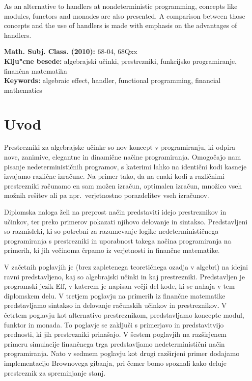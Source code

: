 \documentclass[a4paper,12pt]{article}
\theoremstyle{definition} %
\begin{document}
As an alternative to handlers at nondeterministic programming, concepts like modules, functors and monades are also presented. A comparison between those concepts and the use of handlers is made with emphasis on the advantages of handlers.

\vfill\noindent
{\bf Math. Subj. Class. (2010):} 68-04, 68Qxx  \\[1mm]  
{\bf Klju"cne besede:} algebrajski učinki, prestrezniki, funkcijsko programiranje, finančna matematika  \\[1mm]  
{\bf Keywords:}  algebraic effect, handler, functional programming, financial mathematics
\pagebreak

\pagebreak

\section{Uvod}

Prestrezniki za algebrajske učinke so nov koncept v programiranju, ki odpira nove, zanimive, elegantne in dinamične načine programiranja. Omogočajo nam pisanje nedeterminističnih programov, s katerimi lahko na identični  kodi kasneje izvajamo različne izračune. Na primer tako, da na enaki kodi z različnimi prestrezniki računamo en sam možen izračun, optimalen izračun, množico vseh možnih rešitev ali pa npr.\ verjetnostno porazdelitev vseh izračunov. 

Diplomska naloga želi na preprost način predstaviti idejo prestreznikov in učinkov, ter preko primerov pokazati njihovo delovanje in sintakso. Predstavljeni so razmisleki, ki so potrebni za razumevanje logike nedeterminističnega programiranja s prestrezniki in uporabnost takega načina programiranja na primerih, ki jih večinoma črpamo iz verjetnosti in finančne matematike. 

V začetnih poglavjih je (brez zapletenega teoretičnega ozadja v algebri)  na idejni ravni predstavljeno, kaj so algebrajski učinki in kaj prestrezniki. Predstavljen je programski jezik Eff, v katerem je napisan večji del kode, ki se nahaja v tem diplomskem delu. V tretjem poglavju na primerih iz finančne matematike predstavljamo sintakso in delovanje računskih učinkov in prestreznikov. V četrtem poglavju kot alternativo prestreznikom, predstavljamo koncepte modul, funktor in monada. To poglavje se zaključi s primerjavo in predstavitvijo prednosti, ki jih prestrezniki prinašajo. V šestem poglavjih na razširjenem primeru simulacije finančnega trga predstavljamo nedeterministični način programiranja. Nato v sedmem poglavju kot drugi razširjeni primer dodajamo implementacijo Brownovega gibanja, pri čemer bomo spoznali kako deluje prestreznik za spreminjanje stanj.
\end{document}
